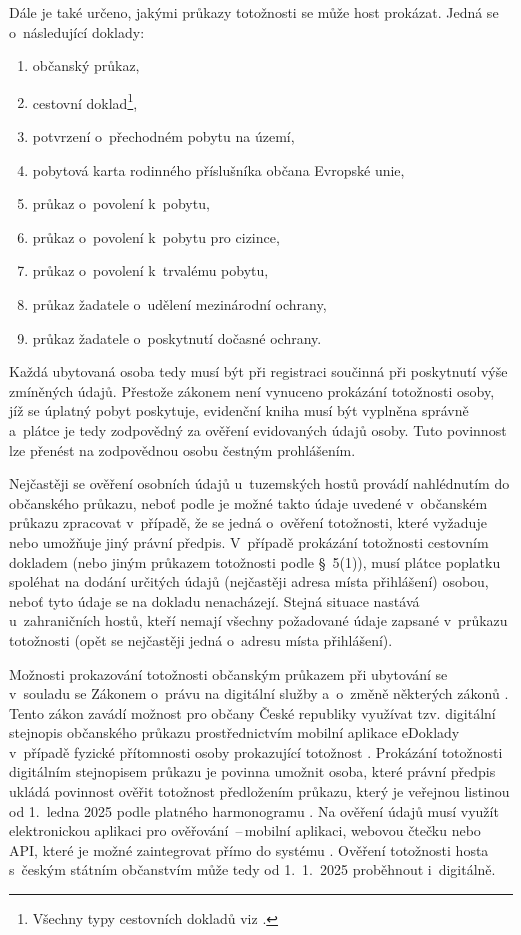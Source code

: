 Dále je také určeno, jakými průkazy totožnosti se může host prokázat.
Jedná se o~následující doklady:
\begin{enumerate}
    \item občanský průkaz,
    \item cestovní doklad\footnote{Všechny typy cestovních dokladů viz \cite[\S~5(1)]{cz-1999-329}.},
    \item potvrzení o~přechodném pobytu na území,
    \item pobytová karta rodinného příslušníka občana Evropské unie,
    \item průkaz o~povolení k~pobytu,
    \item průkaz o~povolení k~pobytu pro cizince,
    \item průkaz o~povolení k~trvalému pobytu,
    \item průkaz žadatele o~udělení mezinárodní ochrany,
    \item průkaz žadatele o~poskytnutí dočasné ochrany.
\end{enumerate}

Každá ubytovaná osoba tedy musí být při registraci součinná při poskytnutí výše zmíněných údajů.
Přestože zákonem není vynuceno prokázání totožnosti osoby, jíž se úplatný pobyt poskytuje, evidenční kniha musí být vyplněna správně a~plátce je tedy zodpovědný za ověření evidovaných údajů osoby.
Tuto povinnost lze přenést na zodpovědnou osobu čestným prohlášením.

Nejčastěji se ověření osobních údajů u~tuzemských hostů provádí nahlédnutím do občanského průkazu, neboť podle \cite[\S~39(d)]{cz-2021-269} je možné takto údaje uvedené v~občanském průkazu zpracovat v~případě, že se jedná o~ověření totožnosti, které vyžaduje nebo umožňuje jiný právní předpis.
V~případě prokázání totožnosti cestovním dokladem (nebo jiným průkazem totožnosti podle \S~5(1)), musí plátce poplatku spoléhat na dodání určitých údajů (nejčastěji adresa místa přihlášení) osobou, neboť tyto údaje se na dokladu nenacházejí.
Stejná situace nastává u~zahraničních hostů, kteří nemají všechny požadované údaje zapsané v~průkazu totožnosti (opět se nejčastěji jedná o~adresu místa přihlášení).

\label{sec:edoklady}
Možnosti prokazování totožnosti občanským průkazem při ubytování se  v~souladu se Zákonem o~právu na digitální služby a~o~změně některých zákonů \cite{cz-2020-12}.
Tento zákon zavádí možnost pro občany České republiky využívat tzv. digitální stejnopis občanského průkazu prostřednictvím mobilní aplikace eDoklady \cite[\S~9a(1), \S~9b(1)]{cz-2020-12} v~případě fyzické přítomnosti osoby prokazující totožnost \cite[\S~9b(2)]{cz-2020-12}.
Prokázání totožnosti digitálním stejnopisem průkazu je povinna umožnit osoba, které právní předpis ukládá povinnost ověřit totožnost předložením průkazu, který je veřejnou listinou \cite[\S~9a(2)]{cz-2020-12} od 1.~ledna 2025 podle platného harmonogramu \cite{www-edoklady-harmonogram}.
Na ověření údajů musí využít elektronickou aplikaci pro ověřování \cite[\S~9b(1)]{cz-2020-12}\,--\,mobilní aplikaci, webovou čtečku nebo API, které je možné zaintegrovat přímo do systému \cite{www-edoklady-overeni}.
Ověření totožnosti hosta s~českým státním občanstvím může tedy od 1.~1.~2025 proběhnout i~digitálně.

